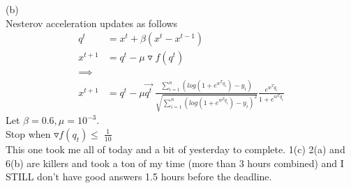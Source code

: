 \documentclass[12pt,letterpaper]{article}
\begin{document}
(b)
\vspace{10pt}\\
Nesterov acceleration updates as follows 
\begin{equation*}
    \begin{split}
        q^t &= x^t + \beta(x^t - x^{t-1})
        \\
        x^{t+1} &= q^t - \mu \triangledown f(q^t)
        \\
        \implies
        \\
         x^{t+1} &= q^t - \mu \Vec{q^t}\; \frac{\sum_{i=1}^n(log(1+e^{w^T q_i}) - y_i)}{\sqrt{\sum_{i=1}^n (log(1+e^{w^T q_i}) - y_i)^2}} \frac{e^{w^T q_i}}{1+e^{w^T q_i}}
    \end{split}
\end{equation*}
Let $\beta = 0.6, \mu = 10^{-3}$.
\\
Stop when $\triangledown f(q_t) \le\; \frac{1}{10}$
\vspace{10pt}
\\
This one took me all of today and a bit of yesterday to complete. 1(c) 2(a) and 6(b) are killers and took a ton of my time (more than 3 hours combined) and I STILL don't have good answers 1.5 hours before the deadline. 
\end{document}
